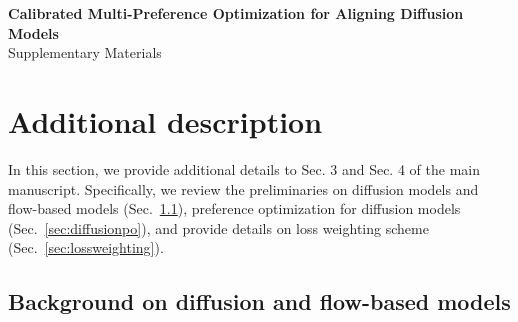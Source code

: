 \clearpage

\onecolumn
\appendix
\begin{center}
    {\bf {\Large Calibrated Multi-Preference Optimization for Aligning Diffusion Models}} \\ 
    \vspace{3mm}
    { \Large Supplementary Materials}
    
\end{center}



\section{Additional description}
In this section, we provide additional details to Sec. 3 and Sec. 4 of the main manuscript. Specifically, we review the preliminaries on diffusion models and flow-based models (Sec.~\ref{sec:bg}), preference optimization for diffusion models (Sec.~\ref{sec:diffusionpo}), and provide details on loss weighting scheme (Sec.~\ref{sec:lossweighting}).

\subsection{Background on diffusion and flow-based models}\label{sec:bg}

